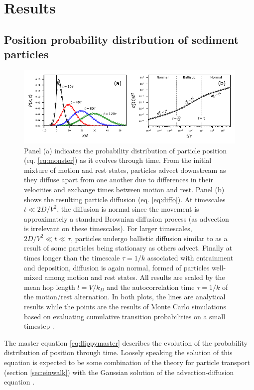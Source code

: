 \section{Results \label{sec:res}}
\subsection{Position probability distribution of sediment particles}
\begin{figure}
	\centerline{\includegraphics{figures/ch2/figure2_slopeKey.pdf}}
	\caption{Panel (a) indicates the probability distribution of particle position (eq. \ref{eq:monster}) as it evolves through time. From the initial mixture of motion and rest states, particles advect downstream as they diffuse apart from one another due to differences in their velocities and exchange times between motion and rest. Panel (b) shows the resulting particle diffusion (eq. \ref{eq:diffo}). At timescales $t \ll 2D/V^2$, the diffusion is normal since the movement is approximately a standard Brownian diffusion process (as advection is irrelevant on these timescales). For larger timescales, $2D/V^2 \ll t \ll \tau$, particles undergo ballistic diffusion similar to \citet{Lisle1998} as a result of some particles being stationary as others advect. Finally at times longer than the timescale $\tau = 1/k$ associated with entrainment and deposition, diffusion is again normal, formed of particles well-mixed among motion and rest states. All results are scaled by the mean hop length $l=V/k_D$ and the autocorrelation time $\tau=1/k$ of the motion/rest alternation. In both plots, the lines are analytical results while the points are the results of Monte Carlo simulations based on evaluating cumulative transition probabilities on a small timestep \citep[e.g.][]{Barik2006}.}
	\label{fig:flippyfig1}
\end{figure}
The master equation \ref{eq:flippymaster} describes the evolution of the probability distribution of position through time. Loosely speaking the solution of this equation is expected to be some combination of the \citet{Einstein1937} theory for particle transport (section \ref{sec:einwalk}) with the Gaussian solution of the advection-diffusion equation \citep{Morse1953a}.

